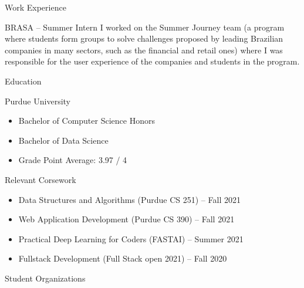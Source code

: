 \documentclass{article}
\newlength{\tabin}
\newlength{\secsep}
\newcommand{\lineunder}{\vspace*{-8pt} \\ \hspace*{-6pt} \hrulefill \\ \vspace*{-15pt}}
\newenvironment{tabbedsection}[1]{
  \begin{list}{}{
      \setlength{\itemsep}{0pt}
      \setlength{\labelsep}{0pt}
      \setlength{\labelwidth}{0pt}
      \setlength{\leftmargin}{\tabin}
      \setlength{\rightmargin}{\tabin}
      \setlength{\listparindent}{0pt}
      \setlength{\parsep}{0pt}
      \setlength{\parskip}{0pt}
      \setlength{\partopsep}{0pt}
      \setlength{\topsep}{#1}
    }
  \item[]
}{\end{list}}
\newenvironment{resume_section}[1]{
  \filbreak
  \vspace{2\secsep}
  \textsc{\large#1}
  \lineunder
  \begin{tabbedsection}{\secsep}
}{\end{tabbedsection}}
\newenvironment{resume_subsection}[2][]{
  \textbf{#2} \hfill {\footnotesize #1} \hspace{2em}
  \begin{tabbedsection}{0.5\secsep}
}{\end{tabbedsection}}
\newenvironment{subitems}{
  \renewcommand{\labelitemi}{-}
  \begin{itemize}
      \setlength{\labelsep}{1em}
}{\end{itemize}}
\begin{document}
\begin{resume_section}{Work Experience}

	\begin{resume_subsection}{BRASA -- Summer Intern}
		I worked on the Summer Journey team (a program where students form groups to solve challenges proposed by leading Brazilian companies in many sectors, such as the financial and retail ones) where I was responsible for the user experience of the companies and students in the program.
	\end{resume_subsection}

\end{resume_section}

\begin{resume_section}{Education}
  
  \begin{resume_subsection}{Purdue University}
    
    \begin{subitems}
      \item Bachelor of Computer Science Honors
      \item Bachelor of Data Science
      \item Grade Point Average: 3.97 / 4
    \end{subitems}
  
  \end{resume_subsection}
  
  \begin{resume_subsection}[]{Relevant Corsework}
  	
	\begin{subitems}
		\item Data Structures and Algorithms (Purdue CS 251) -- Fall 2021
		\item Web Application Development (Purdue CS 390) -- Fall 2021
		\item Practical Deep Learning for Coders (FASTAI) -- Summer 2021
		\item Fullstack Development (Full Stack open 2021) -- Fall 2020
	\end{subitems}  	
  	
  \end{resume_subsection}
  
\end{resume_section}

\begin{resume_section}{Student Organizations}

\end{resume_section}
\end{document}
